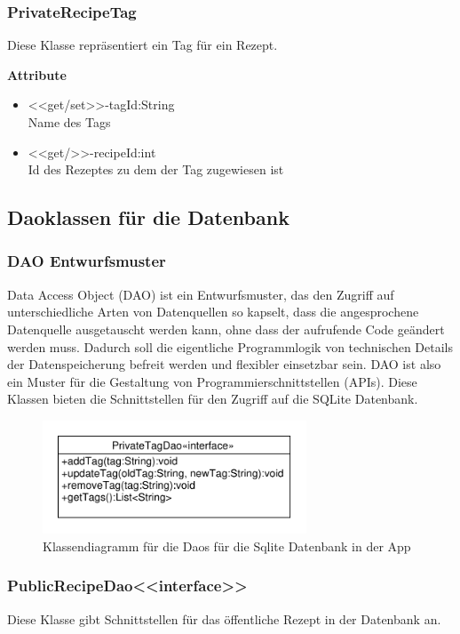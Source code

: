 \subsubsection{PrivateRecipeTag}
Diese Klasse repräsentiert ein Tag für ein Rezept.

\textbf{Attribute}
\begin{itemize}
	\item <<get/set>>-tagId:String \\Name des Tags
	\item <<get/>>-recipeId:int \\Id des Rezeptes zu dem der Tag zugewiesen ist
\end{itemize}

\subsection{Daoklassen für die Datenbank}
\subsubsection{DAO Entwurfsmuster}
Data Access Object (DAO) ist ein Entwurfsmuster, das den Zugriff auf unterschiedliche Arten von Datenquellen so kapselt, dass die angesprochene Datenquelle ausgetauscht werden kann, ohne dass der aufrufende Code geändert werden muss.
Dadurch soll die eigentliche Programmlogik von technischen Details der Datenspeicherung befreit werden und flexibler einsetzbar sein. DAO ist also ein Muster für die Gestaltung von Programmierschnittstellen (APIs). Diese Klassen bieten die Schnittstellen für den Zugriff auf die SQLite Datenbank.
\begin{figure}[H]
	\centering
	\includegraphics[width=0.7\textwidth]{pics/AppSqLiteDao.pdf}%
	\caption{Klassendiagramm für die Daos für die Sqlite Datenbank in der App}%
\end{figure}

\subsubsection{PublicRecipeDao<<interface>>}
Diese Klasse gibt Schnittstellen für das öffentliche Rezept in der Datenbank an.


